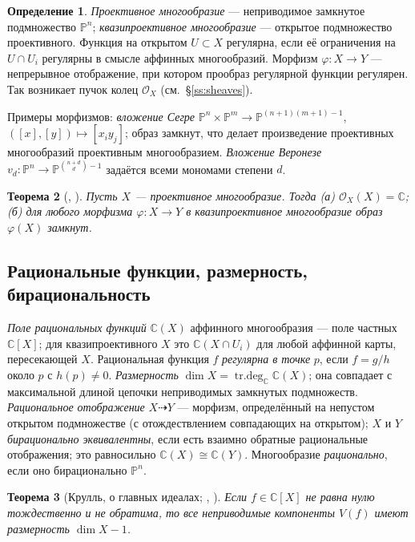 \documentclass[11pt,a4paper]{article}
\theoremstyle{plain}
\newtheorem{theorem}{Теорема}[section]
\theoremstyle{definition}
\newtheorem{definition}[theorem]{Определение}
\theoremstyle{remark}
\renewcommand{\C}{\mathbb{C}}
\newcommand{\PP}{\mathbb{P}}
\newcommand{\cO}{\mathcal{O}}
\DeclareMathOperator{\trdeg}{tr.deg}
\begin{document}
\begin{definition}
\emph{Проективное многообразие} --- неприводимое замкнутое подмножество $\PP^n$;
\emph{квазипроективное многообразие} --- открытое подмножество проективного. Функция на открытом
$U\subset X$ регулярна, если её ограничения на $U\cap U_i$ регулярны в смысле аффинных многообразий.
Морфизм $\varphi\colon X\to Y$ --- непрерывное отображение, при котором прообраз регулярной функции
регулярен. Так возникает пучок колец $\cO_X$ (см.~\S\ref{ss:sheaves}).
\end{definition}

Примеры морфизмов: \emph{вложение Сегре} $\PP^n\times\PP^m\to\PP^{(n+1)(m+1)-1}$,
$([x],[y])\mapsto [x_iy_j]$; образ замкнут, что делает произведение проективных многообразий
проективным многообразием. \emph{Вложение Веронезе} $v_d\colon\PP^n\to\PP^{\binom{n+d}{d}-1}$
задаётся всеми мономами степени $d$.

\begin{theorem}[{\cite[I.5]{Sh}, \cite[I.3.4, II.4.9]{Ha}}]\label{thm:complete}
Пусть $X$ --- проективное многообразие. Тогда (а) $\cO_X(X)=\C$; (б) для любого морфизма
$\varphi\colon X\to Y$ в квазипроективное многообразие образ $\varphi(X)$ замкнут.
\end{theorem}

\subsection{Рациональные функции, размерность, бирациональность}

\emph{Поле рациональных функций} $\C(X)$ аффинного многообразия --- поле частных $\C[X]$; для
квазипроективного $X$ это $\C(X\cap U_i)$ для любой аффинной карты, пересекающей $X$. Рациональная
функция $f$ \emph{регулярна в точке} $p$, если $f=g/h$ около $p$ с $h(p)\ne0$.
\emph{Размерность} $\dim X=\trdeg_\C \C(X)$; она совпадает с максимальной длиной цепочки
неприводимых замкнутых подмножеств. \emph{Рациональное отображение} $X\dashrightarrow Y$ ---
морфизм, определённый на непустом открытом подмножестве (с отождествлением совпадающих на
открытом); $X$ и $Y$ \emph{бирационально эквивалентны}, если есть взаимно обратные рациональные
отображения; это равносильно $\C(X)\cong\C(Y)$. Многообразие \emph{рационально}, если оно
бирационально $\PP^n$.

\begin{theorem}[{Крулль, о главных идеалах; \cite[I.6, Теорема 5]{Sh}, \cite[I.1.11A]{Ha}}]\label{thm:Krull}
Если $f\in\C[X]$ не равна нулю тождественно и не обратима, то все неприводимые компоненты $V(f)$
имеют размерность $\dim X-1$.
\end{theorem}
\end{document}
